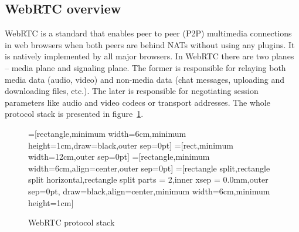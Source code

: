 \subsection{WebRTC overview}
\label{subsec:webrtc-overview}
WebRTC is a standard that enables peer to peer (P2P) multimedia connections in web browsers when both peers are behind NATs without using any plugins.
It is natively implemented by all major browsers.
In WebRTC there are two planes -- media plane and signaling plane.
The former is responsible for relaying both media data (audio, video) and non-media data (chat messages, uploading and downloading files, etc.).
The later is responsible for negotiating session parameters like audio and video codecs or transport addresses.
The whole protocol stack is presented in figure~\ref{fig:webrtc-stack}.

\begin{figure}[h]
    \centering
    =[rectangle,minimum width=6cm,minimum height=1cm,draw=black,outer sep=0pt]
    =[rect,minimum width=12cm,outer sep=0pt]
    =[rectangle,minimum width=6cm,align=center,outer sep=0pt]
    =[rectangle split,rectangle split horizontal,rectangle split parts = 2,inner xsep = 0.0mm,outer sep=0pt,
    draw=black,align=center,minimum width=6cm,minimum height=1cm]
    \caption{WebRTC protocol stack}
    \label{fig:webrtc-stack}
\end{figure}

